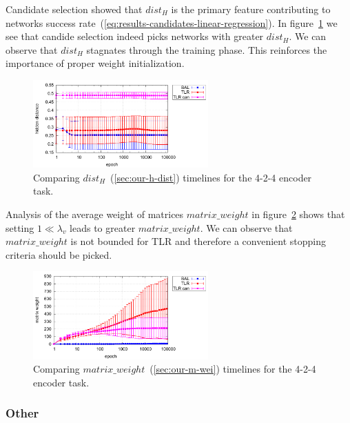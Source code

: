 Candidate selection showed that $dist_{H}$ is the primary feature contributing to networks success rate~(\ref{eq:results-candidates-linear-regression}). In figure~\ref{fig:results-candidates-h-dist} we see that candide selection indeed picks networks with greater $dist_{H}$. We can observe that $dist_{H}$ stagnates through the training phase. This reinforces the importance of proper weight initialization. 

\begin{figure}[H]
  \centering
  \includegraphics[width=0.6\textwidth]{img/feature-cmp-h-dist.pdf}  
   \caption{Comparing $dist_{H}$~(\ref{sec:our-h-dist}) timelines for the {4-2-4 encoder} task.}
  \label{fig:results-candidates-h-dist}
\end{figure}

Analysis of the average weight of matrices $matrix\_weight$ in figure~\ref{fig:results-candidates-m-wei} shows that setting $1 \ll \lambda_v$ leads to greater $matrix\_weight$. We can observe that $matrix\_weight$ is not bounded for TLR and therefore a convenient stopping criteria should be picked. 

\begin{figure}[H]
  \centering
  \includegraphics[width=0.6\textwidth]{img/feature-cmp-m-wei.pdf}  
   \caption{Comparing $matrix\_weight$~(\ref{sec:our-m-wei}) timelines for the {4-2-4 encoder} task.}
  \label{fig:results-candidates-m-wei}
\end{figure}


\subsubsection{Other}

